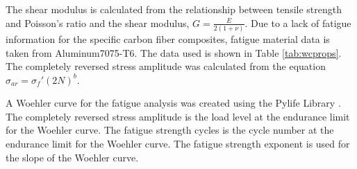 \documentclass[doublespace,nopageskip]{VTthesis}
\begin{document}
		The shear modulus is calculated from the relationship between tensile strength and Poisson's ratio and the shear modulus, $G=\frac{E}{2(1+\nu)}$. Due to a lack of fatigue information for the specific carbon fiber composites, fatigue material data is taken from Aluminum7075-T6\cite{MatWeb}. The data used is shown in Table \ref{tab:wcprops}. The completely reversed stress amplitude was calculated from the equation $\sigma_{ar} = \sigma_f'(2N)^b$.	
		
		\begin{table}[H]
			\centering
			\caption{Material Properties for Fatigue}
			\label{tab:wcprops}
		\end{table}
		
		A Woehler curve for the fatigue analysis was created using the Pylife Library \cite{pyLife}. The completely reversed stress amplitude is the load level at the endurance limit for the Woehler curve. The fatigue strength cycles is the cycle number at the endurance limit for the Woehler curve. The fatigue strength exponent is used for the slope of the Woehler curve. %
		
		
				

	
\end{document}

